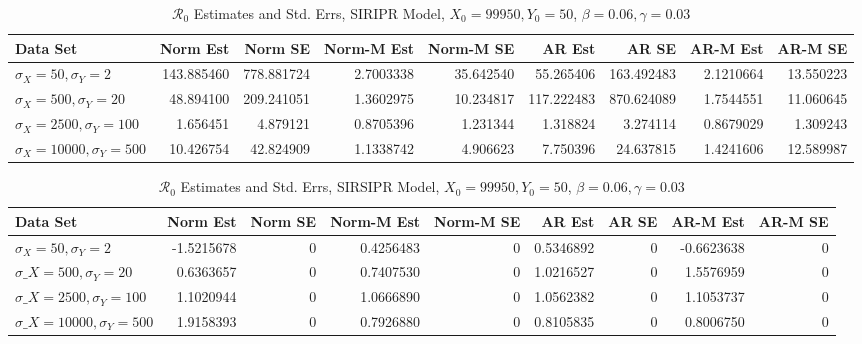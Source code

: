 \documentclass[12pt]{article}
\newcommand{\rr}{\ensuremath{\mathcal{R}_0}}
\begin{document}
\begin{table}[H]
	
	\caption{\label{tab:}$\rr$ Estimates and Std. Errs, SIRIPR Model,
		$X_0 = 99950, Y_0 = 50$, $\beta = 0.06, \gamma = 0.03$}
	\centering
	\begin{footnotesize}
	\begin{tabular}[t]{l|r|r|r|r|r|r|r|r}
		\hline
		Data Set & Norm Est & Norm SE & Norm-M Est & Norm-M SE & AR Est & AR SE & AR-M Est & AR-M SE\\
		\hline
		$\sigma_X = 50, \sigma_Y = 2$ & 143.885460 & 778.881724 & 2.7003338 & 35.642540 & 55.265406 & 163.492483 & 2.1210664 & 13.550223\\
		\hline
		$\sigma_X = 500, \sigma_Y = 20$ & 48.894100 & 209.241051 & 1.3602975 & 10.234817 & 117.222483 & 870.624089 & 1.7544551 & 11.060645\\
		\hline
		$\sigma_X = 2500, \sigma_Y = 100$ & 1.656451 & 4.879121 & 0.8705396 & 1.231344 & 1.318824 & 3.274114 & 0.8679029 & 1.309243\\
		\hline
		$\sigma_X = 10000, \sigma_Y = 500$ & 10.426754 & 42.824909 & 1.1338742 & 4.906623 & 7.750396 & 24.637815 & 1.4241606 & 12.589987\\
		\hline
	\end{tabular}
\end{footnotesize}
\end{table}
\begin{table}[H]
	
	\caption{\label{tab:}$\rr$ Estimates and Std. Errs, SIRSIPR Model,
		$X_0 = 99950, Y_0 = 50$, $\beta = 0.06, \gamma = 0.03$}
	\centering
	\begin{footnotesize}
	\begin{tabular}[t]{l|r|r|r|r|r|r|r|r}
		\hline
		Data Set & Norm Est & Norm SE & Norm-M Est & Norm-M SE & AR Est & AR SE & AR-M Est & AR-M SE\\
		\hline
		$\sigma_X = 50, \sigma_Y = 2$ & -1.5215678 & 0 & 0.4256483 & 0 & 0.5346892 & 0 & -0.6623638 & 0\\
		\hline
		$\sigma\_X = 500, \sigma_Y = 20$ & 0.6363657 & 0 & 0.7407530 & 0 & 1.0216527 & 0 & 1.5576959 & 0\\
		\hline
		$\sigma\_X = 2500, \sigma_Y = 100$ & 1.1020944 & 0 & 1.0666890 & 0 & 1.0562382 & 0 & 1.1053737 & 0\\
		\hline
		$\sigma\_X = 10000, \sigma_Y = 500$ & 1.9158393 & 0 & 0.7926880 & 0 & 0.8105835 & 0 & 0.8006750 & 0\\
		\hline
	\end{tabular}
\end{footnotesize}
\end{table}
\end{document}
